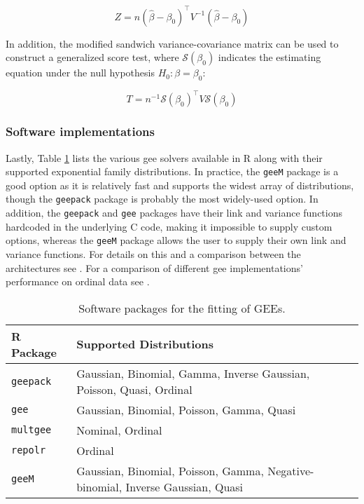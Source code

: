 \documentclass{report}
\begin{document}
\begin{equation}\label{eq:glm-gee-generalized-wald-stat}
    Z = n \left(\hat{\beta} - \beta_0\right)^\intercal V^{-1} \left(\hat{\beta} - \beta_0\right)
\end{equation}

In addition, the modified sandwich variance-covariance matrix can be used to construct a generalized score test, where $\mathcal{S}(\beta_0)$ indicates the estimating equation under the null hypothesis $H_0: \beta = \beta_0$:

\begin{equation}\label{eq:glm-gee-generalized-score-stat}
    T = n^{-1} \mathcal{S}(\beta_0)^\intercal V \mathcal{S}(\beta_0)
\end{equation}

\subsubsection{Software implementations}

Lastly, Table \ref{table:gee-software} lists the various \gls{gee} solvers available in R along with their supported exponential family distributions. In practice, the \texttt{geeM} package is a good option as it is relatively fast and supports the widest array of distributions, though the \texttt{geepack} package is probably the most widely-used option. In addition, the \texttt{geepack} and \texttt{gee} packages have their link and variance functions hardcoded in the underlying C code, making it impossible to supply custom options, whereas the \texttt{geeM} package allows the user to supply their own link and variance functions. For details on this and a comparison between the architectures see \cite{mcdaniel_fast_2013}. For a comparison of different \gls{gee} implementations' performance on ordinal data see \cite{nooraee_gee_2014}. 

\begin{table}[h!]
\centering
\begin{tabular}{||l l||} 
  \hline
  \textbf{R Package} & \textbf{Supported Distributions} \\ [0.5ex]
   \hline\hline
   \texttt{geepack} & Gaussian, Binomial, Gamma, Inverse Gaussian, Poisson, Quasi, Ordinal \\
   \hline
   \texttt{gee} & Gaussian, Binomial, Poisson, Gamma, Quasi \\
   \hline 
   \texttt{multgee} & Nominal, Ordinal \\
   \hline
   \texttt{repolr} & Ordinal \\
   \hline 
   \texttt{geeM} & Gaussian, Binomial, Poisson, Gamma, Negative-binomial, Inverse Gaussian, Quasi \\ 
   \hline
\end{tabular}
\caption{Software packages for the fitting of GEEs.}
\label{table:gee-software}
\end{table}
\end{document}
